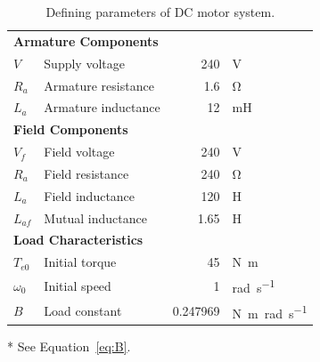 \documentclass[a4paper,10pt]{article}
\newcommand{\V}{\si{\volt}\xspace}
\newcommand{\Ohm}{\si{\ohm}\xspace}
\renewcommand{\H}{\si{\henry}\xspace}
\newcommand{\mH}{\si{\milli\henry}\xspace}
\newcommand{\Nm}{\si{\newton\metre}\xspace}
\newcommand{\rps}{\si{\radian\per\second}\xspace}
\newcommand{\Nmspr}{\si{\newton\metre\radian\per\second}\xspace}
\begin{document}
\begin{table}[t]
    \centering
    \begin{threeparttable}
        \caption{Defining parameters of DC motor system.}
        \label{table:Parameters}
        \begin{tabular}{llrl}
            \toprule
            \multicolumn{4}{l}{\textbf{Armature Components}} \\
            \hspace{1em}$V$   & Supply voltage      & 240 & \V \\
            \hspace{1em}$R_a$ & Armature resistance & 1.6 & \Ohm \\
            \hspace{1em}$L_a$ & Armature inductance &  12 & \mH \\
            \midrule
            \multicolumn{4}{l}{\textbf{Field Components}} \\
            \hspace{1em}$V_f$    & Field voltage     &  240 & \V \\
            \hspace{1em}$R_a$    & Field resistance  &  240 & \Ohm \\
            \hspace{1em}$L_a$    & Field inductance  &  120 & \H \\
            \hspace{1em}$L_{af}$ & Mutual inductance & 1.65 & \H \\
            \midrule
            \multicolumn{4}{l}{\textbf{Load Characteristics}} \\
            \hspace{1em}$T_{e0}$   & Initial torque         & 45       & \Nm \\
            \hspace{1em}$\omega_0$ & Initial speed          &  1       & \rps \\
            \hspace{1em}$B$        & Load constant\tnote{*} & 0.247969 & \Nmspr 
            \\
            \bottomrule
        \end{tabular}
        \begin{tablenotes}
            \item[*]See Equation~\vref{eq:B}.
        \end{tablenotes}
    \end{threeparttable}
\end{table}
\end{document}
